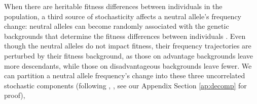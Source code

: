 \documentclass[11pt]{article}
\newcommand{\E}{\mathbb{E}}
\DeclareMathOperator{\var}{Var}
\begin{document}

When there are heritable fitness differences between individuals in the
population, a third source of stochasticity affects a neutral allele's
frequency change: neutral alleles can become randomly associated with the
genetic backgrounds that determine the fitness differences between individuals
\parencite{Robertson1961-ho,Santiago1995-hx,Santiago1998-bs}. Even though the
neutral alleles do not impact fitness, their frequency trajectories are
perturbed by their fitness background, as those on advantage backgrounds leave
more descendants, while those on disadvantageous backgrounds leave fewer. We
can partition a neutral allele frequency's change into these three uncorrelated
stochastic components (following \citeauthor{Santiago1995-hx},
\citeyear{Santiago1995-hx}, see our Appendix Section \ref{ap:decomp} for
proof),
\end{document}
